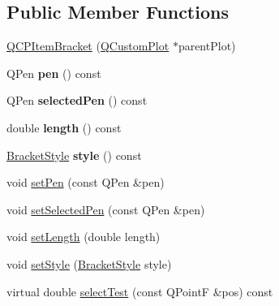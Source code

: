 \subsection*{Public Member Functions}
\begin{DoxyCompactItemize}
\item 
\hyperlink{classQCPItemBracket_a44ecfa37a76de5e3549e2d61f9d8ee56}{Q\-C\-P\-Item\-Bracket} (\hyperlink{classQCustomPlot}{Q\-Custom\-Plot} $\ast$parent\-Plot)
\item 
\hypertarget{classQCPItemBracket_a8963ff4a232b649c83d2461fd3c30d39}{Q\-Pen {\bfseries pen} () const }\label{classQCPItemBracket_a8963ff4a232b649c83d2461fd3c30d39}

\item 
\hypertarget{classQCPItemBracket_a9f6ea5ea9559ef36dfacdadd6e9bdcf0}{Q\-Pen {\bfseries selected\-Pen} () const }\label{classQCPItemBracket_a9f6ea5ea9559ef36dfacdadd6e9bdcf0}

\item 
\hypertarget{classQCPItemBracket_aed5126eafcb1381ee5718499c20ba023}{double {\bfseries length} () const }\label{classQCPItemBracket_aed5126eafcb1381ee5718499c20ba023}

\item 
\hypertarget{classQCPItemBracket_afad726f453f70fe77c0e9c2f260fff97}{\hyperlink{classQCPItemBracket_a7ac3afd0b24a607054e7212047d59dbd}{Bracket\-Style} {\bfseries style} () const }\label{classQCPItemBracket_afad726f453f70fe77c0e9c2f260fff97}

\item 
void \hyperlink{classQCPItemBracket_ab13001d9cc5d8f9e56ea15bdda682acb}{set\-Pen} (const Q\-Pen \&pen)
\item 
void \hyperlink{classQCPItemBracket_a349785c31122778a520c64891fa204c5}{set\-Selected\-Pen} (const Q\-Pen \&pen)
\item 
void \hyperlink{classQCPItemBracket_ac7cfc3da7da9b5c5ac5dfbe4f0351b2a}{set\-Length} (double length)
\item 
void \hyperlink{classQCPItemBracket_a612dffa2373422eef8754d690add3703}{set\-Style} (\hyperlink{classQCPItemBracket_a7ac3afd0b24a607054e7212047d59dbd}{Bracket\-Style} style)
\item 
virtual double \hyperlink{classQCPItemBracket_a3e4bf2f77e147e46e375b7aa288f52ae}{select\-Test} (const Q\-Point\-F \&pos) const 
\end{DoxyCompactItemize}

